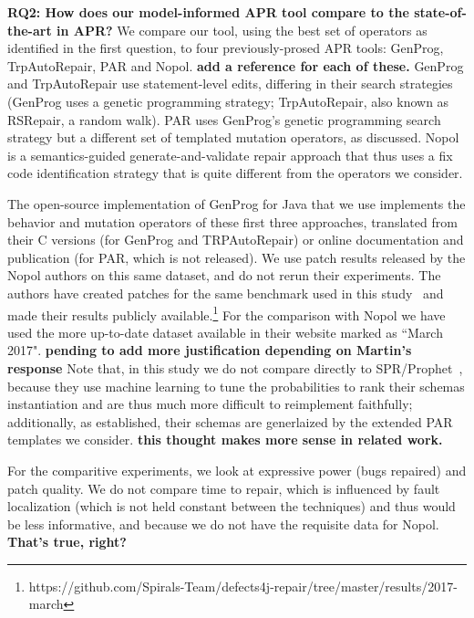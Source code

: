\documentclass[conference]{IEEEtran}
\newcommand{\todo}[1]
  {{\scriptsize \textbf{\color{red} {#1}}}}
\begin{document}
\vspace{1ex}
\noindent\textbf{RQ2: How does our model-informed APR tool compare to the
    state-of-the-art in APR?}  We compare our tool, using the best set of
  operators as identified in the first question, to four previously-prosed APR
  tools:  GenProg, TrpAutoRepair, PAR and Nopol.\todo{add
  a reference for each of these.} GenProg and TrpAutoRepair use
statement-level edits, differing in their search strategies (GenProg uses a
genetic programming strategy; TrpAutoRepair, also known as RSRepair, a random
walk). PAR uses GenProg's genetic programming search strategy but a different
set of templated mutation operators, as discussed.  Nopol is a semantics-guided
generate-and-validate repair approach that thus uses a fix code identification
strategy that is quite different from the operators we consider.  

The open-source implementation of GenProg for Java that we use implements 
the behavior and mutation operators of these first three approaches, translated
from their C versions (for GenProg and TRPAutoRepair) or online documentation
and publication (for PAR, which is not released).  We use patch results released
by the Nopol authors on this same dataset, and do not rerun their experiments.
The authors have created patches for the same benchmark used in
this study~\cite{martinez2016} and made their results publicly
available.\footnote{https://github.com/Spirals-Team/defects4j-repair/tree/master/results/2017-march}
For the comparison with Nopol we have used the more up-to-date dataset available
in their website marked as ``March 2017".\todo{pending to add more justification
  depending on Martin's response} 
Note that, in this study we do not compare directly to SPR/Prophet~\cite{long16proph},
because they use machine learning to tune the probabilities
to rank their schemas instantiation and are thus much more difficult to reimplement
faithfully; additionally, as established, their schemas are generlaized by the
extended PAR templates we consider. \todo{this thought makes more sense in related work.}

For the comparitive experiments, we look at expressive power (bugs repaired) and
patch quality.  We do not compare time to repair, which is influenced by fault
localization (which is not held constant between the techniques) and thus would
be less informative, and because we do not have the requisite data for
Nopol.\todo{That's true, right?}
\end{document}
